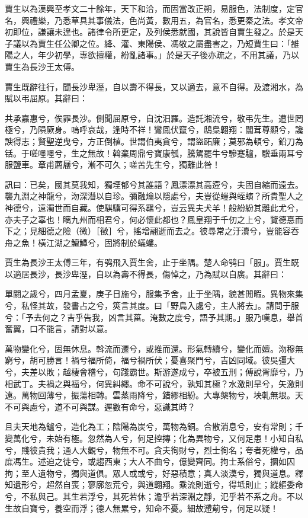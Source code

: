 \begin{pinyinscope}
賈生以為漢興至孝文二十餘年，天下和洽，而固當改正朔，易服色，法制度，定官名，興禮樂，乃悉草具其事儀法，色尚黃，數用五，為官名，悉更秦之法。孝文帝初即位，謙讓未遑也。諸律令所更定，及列侯悉就國，其說皆自賈生發之。於是天子議以為賈生任公卿之位。絳、灌、東陽侯、馮敬之屬盡害之，乃短賈生曰：「雒陽之人，年少初學，專欲擅權，紛亂諸事。」於是天子後亦疏之，不用其議，乃以賈生為長沙王太傅。

賈生既辭往行，聞長沙卑溼，自以壽不得長，又以適去，意不自得。及渡湘水，為賦以弔屈原。其辭曰：

共承嘉惠兮，俟罪長沙。側聞屈原兮，自沈汨羅。造託湘流兮，敬弔先生。遭世罔極兮，乃隕厥身。嗚呼哀哉，逢時不祥！鸞鳳伏竄兮，鴟梟翺翔：闒茸尊顯兮，讒諛得志；賢聖逆曳兮，方正倒植。世謂伯夷貪兮，謂盜跖廉；莫邪為頓兮，鉛刀為铦。于嗟嚜嚜兮，生之無故！斡棄周鼎兮寶康瓠，騰駕罷牛兮驂蹇驢，驥垂兩耳兮服鹽車。章甫薦屨兮，漸不可久；嗟苦先生兮，獨離此咎！

訊曰：已矣，國其莫我知，獨堙郁兮其誰語？鳳漂漂其高遰兮，夫固自縮而遠去。襲九淵之神龍兮，沕深潛以自珍。彌融爚以隱處兮，夫豈從螘與蛭螾？所貴聖人之神德兮，遠濁世而自藏。使騏驥可得系羈兮，豈云異夫犬羊！般紛紛其離此尤兮，亦夫子之辜也！瞝九州而相君兮，何必懷此都也？鳳皇翔于千仞之上兮，覽德惪而下之；見細德之險（微）［徵］兮，搖增翮逝而去之。彼尋常之汙瀆兮，豈能容吞舟之魚！橫江湖之鱣鱏兮，固將制於蟻螻。

賈生為長沙王太傅三年，有鸮飛入賈生舍，止于坐隅。楚人命鸮曰「服」。賈生既以適居長沙，長沙卑溼，自以為壽不得長，傷悼之，乃為賦以自廣。其辭曰：

單閼之歲兮，四月孟夏，庚子日施兮，服集予舍，止于坐隅，貌甚閒暇。異物來集兮，私怪其故，發書占之兮，筴言其度。曰「野鳥入處兮，主人將去」。請問于服兮：「予去何之？吉乎告我，凶言其菑。淹數之度兮，語予其期。」服乃嘆息，舉首奮翼，口不能言，請對以意。

萬物變化兮，固無休息。斡流而遷兮，或推而還。形氣轉續兮，變化而嬗。沕穆無窮兮，胡可勝言！禍兮福所倚，福兮禍所伏；憂喜聚門兮，吉凶同域。彼吳彊大兮，夫差以敗；越棲會稽兮，句踐霸世。斯游遂成兮，卒被五刑；傅說胥靡兮，乃相武丁。夫禍之與福兮，何異糾纆。命不可說兮，孰知其極？水激則旱兮，矢激則遠。萬物回薄兮，振蕩相轉。雲蒸雨降兮，錯繆相紛。大專槃物兮，坱軋無垠。天不可與慮兮，道不可與謀。遲數有命兮，惡識其時？

且夫天地為鑪兮，造化為工；陰陽為炭兮，萬物為銅。合散消息兮，安有常則；千變萬化兮，未始有極。忽然為人兮，何足控摶；化為異物兮，又何足患！小知自私兮，賤彼貴我；通人大觀兮，物無不可。貪夫徇財兮，烈士徇名；夸者死權兮，品庶馮生。述迫之徒兮，或趨西東；大人不曲兮，億變齊同。拘士系俗兮，攌如囚拘；至人遺物兮，獨與道俱。眾人或或兮，好惡積意；真人淡漠兮，獨與道息。釋知遺形兮，超然自喪；寥廓忽荒兮，與道翺翔。乘流則逝兮，得坻則止；縱軀委命兮，不私與己。其生若浮兮，其死若休；澹乎若深淵之靜，氾乎若不系之舟。不以生故自寶兮，養空而浮；德人無累兮，知命不憂。細故遰葪兮，何足以疑！


\end{pinyinscope}
